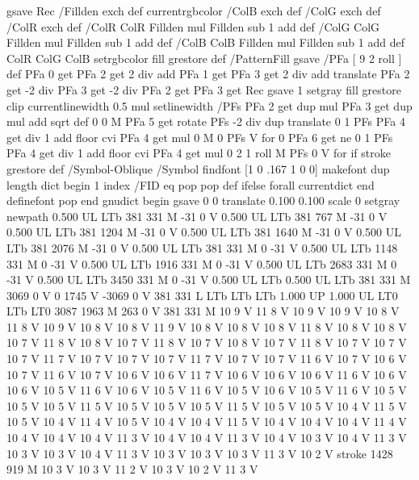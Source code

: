 {{{  gsave Rec
  /Fillden exch def
  currentrgbcolor
  /ColB exch def /ColG exch def /ColR exch def
  /ColR ColR Fillden mul Fillden sub 1 add def
  /ColG ColG Fillden mul Fillden sub 1 add def
  /ColB ColB Fillden mul Fillden sub 1 add def
  ColR ColG ColB setrgbcolor
  fill grestore } def
%
%
/PatternFill { gsave /PFa [ 9 2 roll ] def
    PFa 0 get PFa 2 get 2 div add PFa 1 get PFa 3 get 2 div add translate
    PFa 2 get -2 div PFa 3 get -2 div PFa 2 get PFa 3 get Rec
    gsave 1 setgray fill grestore clip
    currentlinewidth 0.5 mul setlinewidth
    /PFs PFa 2 get dup mul PFa 3 get dup mul add sqrt def
    0 0 M PFa 5 get rotate PFs -2 div dup translate
	0 1 PFs PFa 4 get div 1 add floor cvi
	{ PFa 4 get mul 0 M 0 PFs V } for
    0 PFa 6 get ne {
	0 1 PFs PFa 4 get div 1 add floor cvi
	{ PFa 4 get mul 0 2 1 roll M PFs 0 V } for
    } if
    stroke grestore } def
%
/Symbol-Oblique /Symbol findfont [1 0 .167 1 0 0] makefont
dup length dict begin {1 index /FID eq {pop pop} {def} ifelse} forall
currentdict end definefont pop
end
gnudict begin
gsave
0 0 translate
0.100 0.100 scale
0 setgray
newpath
0.500 UL
LTb
381 331 M
-31 0 V
0.500 UL
LTb
381 767 M
-31 0 V
0.500 UL
LTb
381 1204 M
-31 0 V
0.500 UL
LTb
381 1640 M
-31 0 V
0.500 UL
LTb
381 2076 M
-31 0 V
0.500 UL
LTb
381 331 M
0 -31 V
0.500 UL
LTb
1148 331 M
0 -31 V
0.500 UL
LTb
1916 331 M
0 -31 V
0.500 UL
LTb
2683 331 M
0 -31 V
0.500 UL
LTb
3450 331 M
0 -31 V
0.500 UL
LTb
0.500 UL
LTb
381 331 M
3069 0 V
0 1745 V
-3069 0 V
381 331 L
LTb
LTb
LTb
1.000 UP
1.000 UL
LT0
LTb
LT0
3087 1963 M
263 0 V
381 331 M
10 9 V
11 8 V
10 9 V
10 9 V
10 8 V
11 8 V
10 9 V
10 8 V
10 8 V
11 9 V
10 8 V
10 8 V
10 8 V
11 8 V
10 8 V
10 8 V
10 7 V
11 8 V
10 8 V
10 7 V
11 8 V
10 7 V
10 8 V
10 7 V
11 8 V
10 7 V
10 7 V
10 7 V
11 7 V
10 7 V
10 7 V
10 7 V
11 7 V
10 7 V
10 7 V
11 6 V
10 7 V
10 6 V
10 7 V
11 6 V
10 7 V
10 6 V
10 6 V
11 7 V
10 6 V
10 6 V
10 6 V
11 6 V
10 6 V
10 6 V
10 5 V
11 6 V
10 6 V
10 5 V
11 6 V
10 5 V
10 6 V
10 5 V
11 6 V
10 5 V
10 5 V
10 5 V
11 5 V
10 5 V
10 5 V
10 5 V
11 5 V
10 5 V
10 5 V
10 4 V
11 5 V
10 5 V
10 4 V
11 4 V
10 5 V
10 4 V
10 4 V
11 5 V
10 4 V
10 4 V
10 4 V
11 4 V
10 4 V
10 4 V
10 4 V
11 3 V
10 4 V
10 4 V
11 3 V
10 4 V
10 3 V
10 4 V
11 3 V
10 3 V
10 3 V
10 4 V
11 3 V
10 3 V
10 3 V
10 3 V
11 3 V
10 2 V
stroke
1428 919 M
10 3 V
10 3 V
11 2 V
10 3 V
10 2 V
11 3 V
}}
